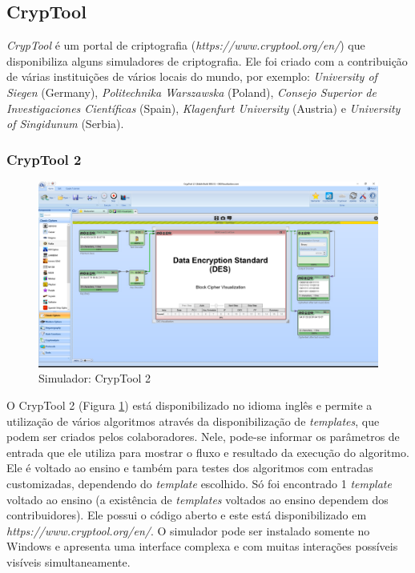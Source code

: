 \subsection{CrypTool}

\textit{CrypTool} é um portal de criptografia (\textit{https://www.cryptool.org/en/}) que disponibiliza alguns simuladores de criptografia. Ele foi criado com a contribuição de várias instituições de vários locais do mundo, por exemplo: \textit{University of Siegen} (Germany), \textit{Politechnika Warszawska} (Poland), \textit{Consejo Superior de Investigaciones Científicas} (Spain), \textit{Klagenfurt University} (Austria) e \textit{University of Singidunum} (Serbia). \cite{cryptool20}

\subsubsection{CrypTool 2}

\begin{figure}[H]
    \centering
    \caption{Simulador: CrypTool 2}
    \label{fig:cryptool2}
    \includegraphics[width=1.2\linewidth,center]{Simuladores/CrypTool2.png}
\end{figure}

O CrypTool 2 (Figura \ref{fig:cryptool2}) está disponibilizado no idioma inglês e permite a utilização de vários algoritmos através da disponibilização de \textit{templates}, que podem ser criados pelos colaboradores. Nele, pode-se informar os parâmetros de entrada que ele utiliza para mostrar o fluxo e resultado da execução do algoritmo. Ele é voltado ao ensino e também para testes dos algoritmos com entradas customizadas, dependendo do \textit{template} escolhido. Só foi encontrado 1 \textit{template} voltado ao ensino (a existência de \textit{templates} voltados ao ensino dependem dos contribuidores). Ele possui o código aberto e este está disponibilizado em \textit{https://www.cryptool.org/en/}. O simulador pode ser instalado somente no Windows e apresenta uma interface complexa e com muitas interações possíveis visíveis simultaneamente. \cite{cryptool14}

